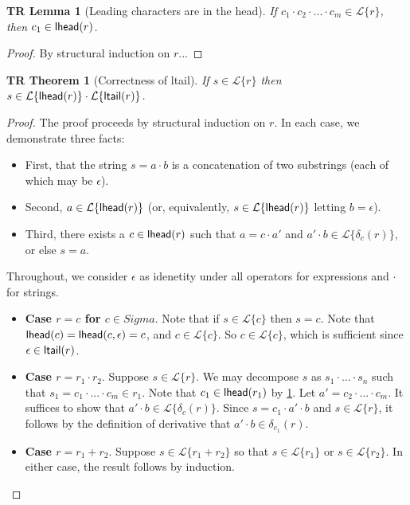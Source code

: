 \documentclass[12pt]{article}
\newtheorem{trthm}[tr]{TR Theorem}
\newtheorem{trlem}[tr]{TR Lemma}
\theoremstyle{definition}
\newcommand{\Lagr}{\mathcal{L}}
\newcommand{\lang}[1]{\Lagr\{#1\}}
\newcommand{\lhead}[1]{ {\sf lhead}(#1) }
\newcommand{\ltail}[1]{ {\sf ltail}(#1) }
\begin{document}
\begin{trlem}[Leading characters are in the head] \label{trlemmax}
If $c_1 \cdot c_2 \cdot ... \cdot c_m \in \lang{r}$, then
$c_1 \in \lhead{r}$.
\end{trlem}
\begin{proof}
By structural induction on $r$...
\end{proof}

\begin{trthm}[Correctness of \textsf{ltail}]
If $s \in \lang{r}$ then $s \in \lang{\lhead{r}} \cdot \lang{\ltail{r}}$.
\end{trthm}
\begin{proof}
The proof proceeds by structural induction on $r$.
In each case, we demonstrate three facts:
\begin{itemize}
  \item First, that the string $s = a \cdot b$ is a concatenation of two substrings (each of which may be $\epsilon$).
  \item Second, $a \in \lang{\lhead{r}}$ (or, equivalently, $s \in \lang{\lhead{r}}$ letting $b = \epsilon$).
  \item Third, there exists a $c \in \lhead{r}$ such that $a = c \cdot a'$ and $a' \cdot b \in \lang{\delta_c(r)}$, or else $s = a$. 
\end{itemize}

Throughout, we consider $\epsilon$ as idenetity under all operators for expressions and $\cdot$ for strings.

\begin{itemize}[label=$ $,itemsep=1ex]

\item \textbf{Case $r = c$ for $c \in Sigma$}.
Note that if $s \in \lang{c}$ then $s = c$.
Note that $\lhead{c} = \lhead{c, \epsilon} = c$, and $c \in \lang{c}$.
So $c \in \lang{c}$, which is sufficient since $\epsilon \in \ltail{r}$.

\item \textbf{Case $r = r_1 \cdot r_2$}.
Suppose $s \in \lang{r}$.
We may decompose $s$ as $s_1 \cdot ... \cdot s_n$ such that $s_1 = c_1 \cdot ... \cdot c_m \in r_1$.
Note that $c_1 \in \lhead{r_1}$ by \ref{trlemmax}.
Let $a' = c_2 \cdot ... \cdot c_m$.
It suffices to show that $a' \cdot b \in \lang{\delta_c(r)}$.
Since $s = c_1 \cdot a' \cdot b$ and $s \in \lang{r}$, it follows by the definition of derivative that $a' \cdot b \in \delta_{c_1}(r)$.

\item \textbf{Case $r = r_1 + r_2$}.
Suppose $s \in \lang{r_1 + r_2}$
so that $s \in \lang{r_1}$ or $s \in \lang{r_2}$.
In either case, the result follows by induction. 


\end{itemize}
\end{proof}
\end{document}
